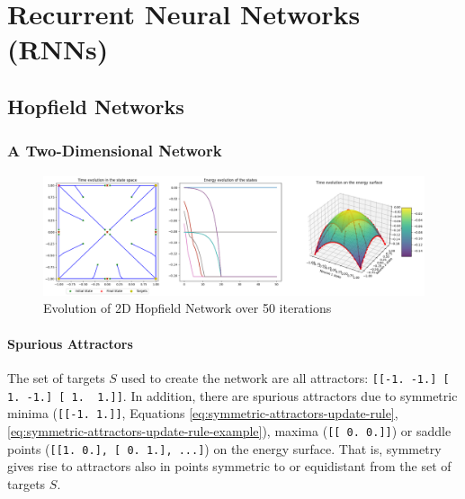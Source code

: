 \section{Recurrent Neural Networks (RNNs)}

\subsection{Hopfield Networks}

\subsubsection{A Two-Dimensional Network}

\begin{figure}[!h]
    \centering
    \includegraphics[width=\textwidth]{figures/hopfield-2d-iterations-50.png}
    \caption{Evolution of 2D Hopfield Network over 50 iterations}
    \label{fig:hopfield-2d-iterations-50}
\end{figure}

\paragraph{Spurious Attractors}

The set of targets $S$ used to create the network are all attractors: \verb|[[-1. -1.] [ 1. -1.] [ 1.  1.]]|.
In addition, there are spurious attractors
due to symmetric minima (\verb|[[-1. 1.]]|, Equations \ref{eq:symmetric-attractors-update-rule}, \ref{eq:symmetric-attractors-update-rule-example}),
maxima (\verb|[[ 0. 0.]]|) or saddle points (\verb|[[1. 0.], [ 0. 1.], ...]|) on the energy surface.
That is, symmetry gives rise to attractors also in points symmetric to  or equidistant from the set of targets $S$.

